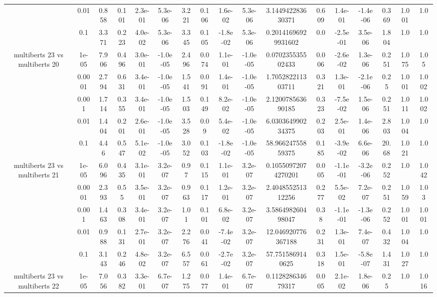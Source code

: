 \begin{tabular}{|c|c|c|c|c|c|c|c|c|c|c|c|c|c|c|c|c|}
 & 0.01 & 0.858 & 0.101 & 2.3e-01 & 5.3e-06 & 3.221 & 0.106 & 1.6e-02 & 5.3e-06 & 3.144942283630371 & 0.609 & 1.4e-01 & -1.4e-06 & 0.369 & 1.001 & 1.0 \\
 & 0.1 & 3.371 & 0.223 & 4.0e-02 & 5.3e-06 & 3.345 & 0.105 & -1.8e-02 & 5.3e-06 & 0.20141696929931602 & 0.0 & -2.5e-01 & 3.5e-06 & 1.804 & 1.0 & 1.0 \\
\hline
\multirow{5}{*}{multiberts 23 vs multiberts 20} & 1e-05 & 7.906 & 0.496 & 3.0e-01 & -1.0e-05 & 2.496 & 0.074 & 1.1e-01 & -1.0e-05 & 0.070235535502433 & 0.006 & -2.6e-02 & 1.3e-06 & 0.251 & 1.075 & 1.05 \\
 & 0.0001 & 2.794 & 0.631 & 3.4e-01 & -1.0e-05 & 1.541 & 0.091 & 1.4e-01 & -1.0e-05 & 1.705282211303711 & 0.321 & 1.3e-01 & -2.1e-06 & 0.25 & 1.001 & 1.002 \\
 & 0.001 & 1.714 & 0.355 & 3.4e-01 & -1.0e-05 & 1.503 & 0.149 & 8.2e-02 & -1.0e-05 & 2.120078563690185 & 0.323 & -7.5e-02 & 1.5e-06 & 0.251 & 1.011 & 1.002 \\
 & 0.01 & 1.404 & 0.201 & 2.6e-01 & -1.0e-05 & 3.528 & 0.09 & 5.4e-02 & -1.0e-05 & 6.030364990234375 & 0.203 & 2.5e-01 & 1.4e-06 & 2.803 & 1.004 & 1.0 \\
 & 0.1 & 4.46 & 0.547 & 5.1e-02 & -1.0e-05 & 3.052 & 0.103 & -1.8e-02 & -1.0e-05 & 58.96624755859375 & 0.185 & -3.9e-02 & 6.6e-06 & 20.68 & 1.021 & 1.0 \\
\hline
\multirow{5}{*}{multiberts 23 vs multiberts 21} & 1e-05 & 6.096 & 0.435 & 3.1e-01 & 3.2e-07 & 0.97 & 0.115 & 1.1e-01 & 3.2e-07 & 0.10550972074270201 & 0.005 & -1.1e-01 & -3.2e-06 & 0.252 & 1.0 & 1.042 \\
 & 0.0001 & 2.393 & 0.55 & 3.5e-01 & 3.2e-07 & 0.963 & 0.117 & 1.2e-01 & 3.2e-07 & 2.404855251312256 & 0.277 & 5.5e-02 & 7.2e-07 & 0.251 & 1.059 & 1.03 \\
 & 0.001 & 1.463 & 0.308 & 3.4e-01 & 3.2e-07 & 1.01 & 0.101 & 6.8e-02 & 3.2e-07 & 3.586498260498047 & 0.38 & -1.1e-01 & -1.3e-06 & 0.252 & 1.001 & 1.001 \\
 & 0.01 & 0.988 & 0.131 & 2.7e-01 & 3.2e-07 & 2.276 & 0.041 & -7.4e-02 & 3.2e-07 & 12.046920776367188 & 0.231 & 1.3e-01 & 7.4e-07 & 0.432 & 1.004 & 1.0 \\
 & 0.1 & 3.143 & 0.246 & 4.8e-02 & 3.2e-07 & 6.557 & 0.061 & -2.7e-02 & 3.2e-07 & 57.7515869140625 & 0.318 & 1.5e-01 & -5.8e-07 & 1.431 & 1.027 & 1.0 \\
\hline
\multirow{5}{*}{multiberts 23 vs multiberts 22} & 1e-05 & 7.056 & 0.382 & 3.3e-01 & 6.7e-07 & 1.275 & 0.077 & 1.4e-01 & 6.7e-07 & 0.112828634679317 & 0.005 & 2.1e-02 & 1.8e-06 & 0.25 & 1.0 & 1.016 \\

\end{tabular}
